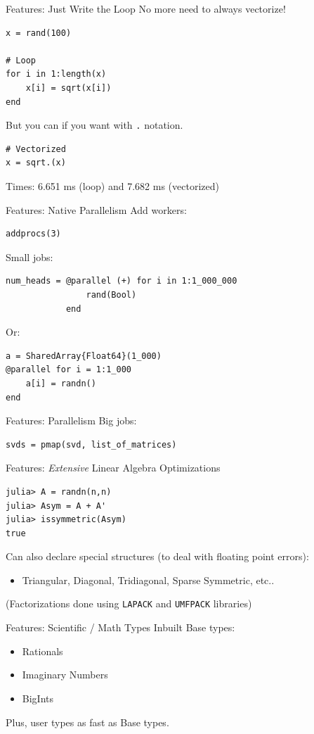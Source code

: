 \documentclass[11pt]{beamer}
\begin{document}
\begin{frame}[fragile]{Features: Just Write the Loop}
No more need to always vectorize!
\begin{verbatim}
x = rand(100)

# Loop
for i in 1:length(x)
    x[i] = sqrt(x[i])
end
\end{verbatim}
But you can if you want with \texttt{.} notation.
\begin{verbatim}
# Vectorized
x = sqrt.(x)
\end{verbatim}
Times: 6.651 ms (loop) and 7.682 ms (vectorized)
\end{frame}

\begin{frame}[fragile]{Features: Native Parallelism}
Add workers:
\begin{verbatim}
addprocs(3)
\end{verbatim}
Small jobs:
\begin{verbatim}
num_heads = @parallel (+) for i in 1:1_000_000
                rand(Bool)
            end
\end{verbatim}
\pause
Or:
\begin{verbatim}
a = SharedArray{Float64}(1_000)
@parallel for i = 1:1_000
    a[i] = randn()
end
\end{verbatim}
\end{frame}


\begin{frame}[fragile]{Features: Parallelism}
Big jobs:
\begin{verbatim}
svds = pmap(svd, list_of_matrices)
\end{verbatim}
\end{frame}

\begin{frame}[fragile]{Features: \emph{Extensive} Linear Algebra Optimizations}
\begin{verbatim}
julia> A = randn(n,n)
julia> Asym = A + A'
julia> issymmetric(Asym)
true
\end{verbatim}
\pause
Can also declare special structures (to deal with floating point errors):
\begin{itemize}
    \item Triangular, Diagonal, Tridiagonal, Sparse Symmetric, etc..
\end{itemize}
\pause (Factorizations done using \texttt{LAPACK} and \texttt{UMFPACK} libraries)
\end{frame}

\begin{frame}[fragile]{Features: Scientific / Math Types Inbuilt}
Base types:
\begin{itemize}
    \item Rationals
    \item Imaginary Numbers
    \item BigInts
\end{itemize}
\pause
Plus, user types as fast as Base types.
\end{frame}
\end{document}
